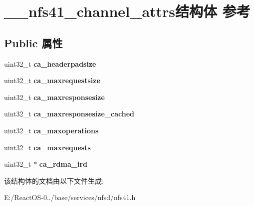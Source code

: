 \hypertarget{struct____nfs41__channel__attrs}{}\section{\+\_\+\+\_\+nfs41\+\_\+channel\+\_\+attrs结构体 参考}
\label{struct____nfs41__channel__attrs}
\subsection*{Public 属性}
\begin{DoxyCompactItemize}
\item 
\mbox{\label{struct____nfs41__channel__attrs_a14792d5b28e67808316f785008666046}} 
uint32\+\_\+t {\bfseries ca\+\_\+headerpadsize}
\item 
\mbox{\label{struct____nfs41__channel__attrs_a12f33bf0091f099597bdb57b8966c3d7}} 
uint32\+\_\+t {\bfseries ca\+\_\+maxrequestsize}
\item 
\mbox{\label{struct____nfs41__channel__attrs_a95494ba53f7d8f56c07af255d01e1d32}} 
uint32\+\_\+t {\bfseries ca\+\_\+maxresponsesize}
\item 
\mbox{\label{struct____nfs41__channel__attrs_a5e86738c2c612c7c64691885e3fc0fb4}} 
uint32\+\_\+t {\bfseries ca\+\_\+maxresponsesize\+\_\+cached}
\item 
\mbox{\label{struct____nfs41__channel__attrs_afe0686a90bf12160daa2636c5376f476}} 
uint32\+\_\+t {\bfseries ca\+\_\+maxoperations}
\item 
\mbox{\label{struct____nfs41__channel__attrs_a57536047026f7a799de0352e581d131c}} 
uint32\+\_\+t {\bfseries ca\+\_\+maxrequests}
\item 
\mbox{\label{struct____nfs41__channel__attrs_a524257e90a25c18cfd4c07717454c628}} 
uint32\+\_\+t $\ast$ {\bfseries ca\+\_\+rdma\+\_\+ird}
\end{DoxyCompactItemize}


该结构体的文档由以下文件生成\+:\begin{DoxyCompactItemize}
\item 
E\+:/\+React\+O\+S-\/0../base/services/nfsd/nfs41.\+h\end{DoxyCompactItemize}
